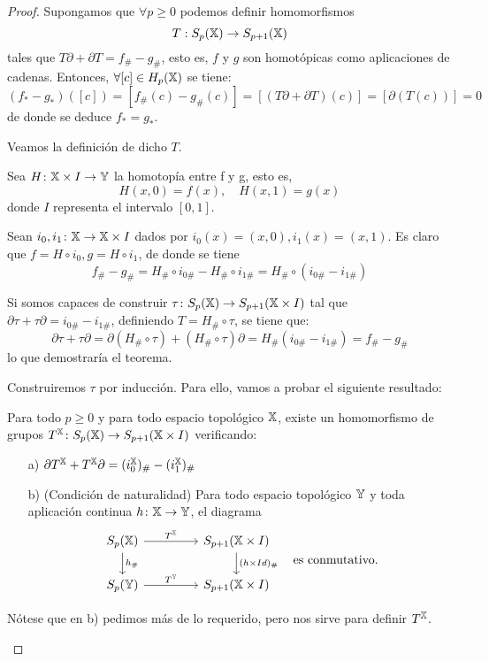 \begin{proof}
  Supongamos que $\forall p \geq 0$ podemos definir homomorfismos \[T: S_{p}({\mathbb X}) \to S_{p+1}({\mathbb X}) \] tales que $T\partial + \partial T = f_\# - g_\#$,
  esto es, $f$ y $g$ son homotópicas como aplicaciones de cadenas. Entonces, $\forall [c] \in H_p({\mathbb X})$ se tiene:
  \[ (f_* - g_*)([c]) = [f_\#(c) - g_\#(c)] = [(T\partial + \partial T)(c)] = [\partial(T(c))] = 0\]
  de donde se deduce $f_* = g_*$.

  Veamos la definición de dicho $T$.

  Sea $H \colon {\mathbb X} \times I \to {\mathbb Y}$ la homotopía entre f y g, esto es,
  \[H(x, 0) = f(x), \quad H(x, 1) = g(x)\]
  donde $I$ representa el intervalo $[0, 1]$.

  Sean $i_0, i_1 \colon {\mathbb X} \to {\mathbb X} \times I$ dados por $i_0(x) = (x, 0), i_1(x) = (x, 1)$. Es claro que $f = H \circ i_0, g = H \circ i_1$, de donde
  se tiene \[ f_\# - g_\# = H_\# \circ i_{0\#} - H_\# \circ i_{1\#} = H_\# \circ (i_{0\#} - i_{1\#}) \]

  Si somos capaces de construir $\tau \colon S_{p}({\mathbb X}) \to S_{p+1}({\mathbb X} \times I)$ tal que $\partial \tau + \tau \partial = i_{0\#} - i_{1\#}$, definiendo
  $T = H_\# \circ \tau$, se tiene que:
  \[ \partial \tau + \tau \partial = \partial(H_\# \circ \tau) + (H_\# \circ \tau)\partial = H_\#(i_{0\#} - i_{1\#}) = f_\# - g_\#  \]
  lo que demostraría el teorema.

  Construiremos $\tau$ por inducción. Para ello, vamos a probar el siguiente resultado:
  \begin{lemma}
    Para todo $p \geq 0$ y para todo espacio topológico ${\mathbb X}$, existe un homomorfismo de grupos $T^{\mathbb X} \colon S_{p}({\mathbb X}) \to S_{p+1}({\mathbb X} \times I)$ verificando:
    \begin{itemize}
      \item[a)] $\partial T^{\mathbb X} + T^{\mathbb X} \partial = (i_0^{\mathbb X})_\# - (i_1^{\mathbb X})_\#$
      \item[b)] (Condición de naturalidad) Para todo espacio topológico ${\mathbb Y}$ y toda aplicación continua $h \colon {\mathbb X} \to {\mathbb Y}$, el diagrama
      \[
      \begin{tikzcd}
        \SX{p} \arrow{r}{T^\X} \arrow{d}{h_\#} & [2em] S_{p+1}(\X \times I) \arrow{d}{(h \times Id)_\#} \\
        \SY{p} \arrow{r}{T^\Y}                 & S_{p+1}(\X \times I)
      \end{tikzcd}
      \quad \text{es conmutativo.}
      \]
    \end{itemize}
    Nótese que en b) pedimos más de lo requerido, pero nos sirve para definir $T^{\mathbb X}$.
  \end{lemma}


\end{proof}
